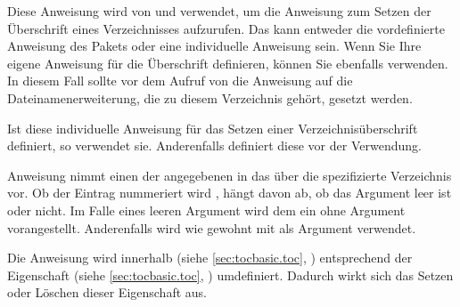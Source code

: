 \begin{Declaration}
\end{Declaration}
Diese Anweisung wird von  und
 verwendet, um die Anweisung zum Setzen
der Überschrift eines Verzeichnisses aufzurufen. Das kann entweder die
vordefinierte Anweisung des Pakets  oder eine individuelle
Anweisung sein. Wenn Sie Ihre eigene Anweisung für die Überschrift definieren,
können Sie ebenfalls  verwenden. In diesem Fall
sollte vor dem Aufruf von  die Anweisung
 auf die
Dateinamenerweiterung, die zu diesem Verzeichnis gehört, gesetzt werden.%
\EndIndexGroup


\begin{Declaration}
\end{Declaration}
Ist diese individuelle Anweisung für das Setzen einer Verzeichnisüberschrift
definiert, so verwendet 
sie. Anderenfalls definiert  diese
vor der Verwendung.%
\EndIndexGroup


\begin{Declaration}
\end{Declaration}
Anweisung
 nimmt einen  der angegebenen
 in das über die  spezifizierte
Verzeichnis vor. Ob der Eintrag nummeriert wird%
, hängt davon ab, ob das Argument  leer ist oder
nicht. Im Falle eines leeren Argument wird dem  ein
 ohne Argument vorangestellt. Anderenfalls wird wie
gewohnt  mit  als
Argument verwendet.

Die Anweisung  wird innerhalb
 (siehe \autoref{sec:tocbasic.toc},
) entsprechend der Eigenschaft
 (siehe \autoref{sec:tocbasic.toc},
) umdefiniert. Dadurch wirkt sich das
Setzen oder Löschen dieser Eigenschaft  %
aus.%
%
\EndIndexGroup


